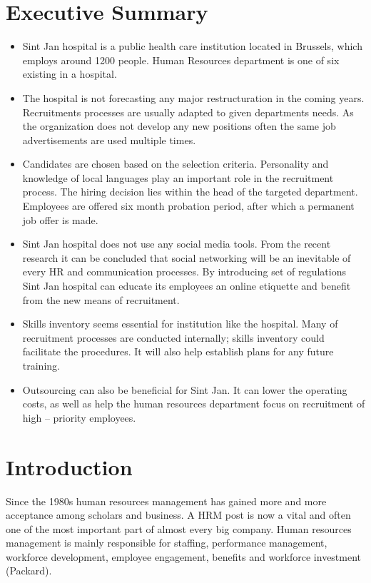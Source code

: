 \documentclass[a4paper,fleqn,11pt,dvips,titlepage]{article}
\numberwithin{figure}{section}
\numberwithin{equation}{section}
\begin{document}
\section*{Executive Summary}

\begin{itemize}
  \item Sint Jan hospital is a public health care institution located in Brussels, which employs around 1200 people. Human Resources department is one of six existing in a hospital.
  \item The hospital is not forecasting any major restructuration in the coming years. Recruitments processes are usually adapted to given departments needs. As the organization does not develop any new positions often the same job advertisements are used multiple times.
  \item Candidates are chosen based on the selection criteria. Personality and knowledge of local languages play an important role in the recruitment process. The hiring decision lies within the head of the targeted department. Employees are offered six month probation period, after which a permanent job offer is made.
  \item Sint Jan hospital does not use any social media tools. From the recent research it can be concluded that social networking will be an inevitable of every HR and communication processes. By introducing set of regulations Sint Jan hospital can educate its employees an online etiquette and benefit from the new means of recruitment.
  \item Skills inventory seems essential for institution like the hospital. Many of recruitment processes are conducted internally; skills inventory could facilitate the procedures. It will also help establish plans for any future training. 
  \item Outsourcing can also be beneficial for Sint Jan. It can lower the operating costs, as well as help the human resources department focus on recruitment of high – priority employees. 
\end{itemize}

\newpage

\tableofcontents
\newpage

\section{Introduction}

Since the 1980s human resources management has gained more and more acceptance among scholars and business.
A HRM post is now a vital and often one of the most important part of almost every big company.
Human resources management is mainly responsible for staffing, performance management, workforce development, employee engagement, benefits and workforce investment (Packard). 
\end{document}
